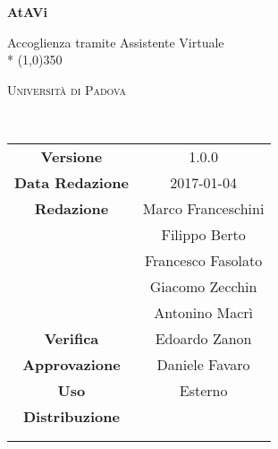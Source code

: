 \documentclass[a4paper,12pt]{article}
\author{2017}
\date{2017-01-04}
\begin{document}
	\begin{titlepage}
		\centering
		{\huge\bfseries AtAVi\par}
		Accoglienza tramite Assistente Virtuale \\*
		\line(1,0){350} \\
		{\scshape\LARGE Università di Padova \par}
		\vspace{1cm}
		{\scshape\Large \analisideirequisitii\ \par}
		\logo
		\newpage
		\begin{tabular}{c|c}
			{\hfill \textbf{Versione}} 			& 1.0.0						\\ 
			{\hfill\textbf{Data Redazione}} 	& 2017-01-04 		\\ 
			{\hfill\textbf{Redazione}} 			& Marco Franceschini \\ & Filippo Berto \\ & Francesco Fasolato \\ & Giacomo Zecchin \\ & Antonino Macrì		\\ 
			{\hfill\textbf{Verifica}} 				& Edoardo Zanon 		\\ 
			{\hfill\textbf{Approvazione}} 		& Daniele Favaro		\\
			{\hfill\textbf{Uso}} 						& Esterno 				\\
			{\hfill\textbf{Distribuzione}} 		& \vardanega \\ & \cardin \\ & \prop \\
		\end{tabular}
	\end{titlepage}
	
	\pagestyle{myfront}
	\newpage
	
	\newpage
	\tableofcontents
	\newpage
	\listoftables
	\newpage
	\listoffigures
	
	\label{LastFrontPage}	
	\newpage	
	\pagestyle{mymain}
				
	\newpage	
		
	\newpage	
			
	\newpage	
		
		
	\label{LastPage}
\end{document}
